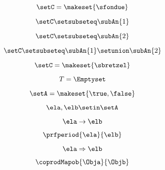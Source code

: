 \begin{forslides}
    \begin{equation}
        \label{eq:feedback-074}
        \setC = \makeset{ \sfondue }
    \end{equation}

    \begin{equation}
        \label{eq:feedback-075}
        \setC \setsubseteq \subAn{1}
    \end{equation}

    \begin{equation}
        \label{eq:feedback-076}
        \setC \setsubseteq \subAn{2}
    \end{equation}

    \begin{equation}
        \label{eq:feedback-077}
        \setC \setsubseteq \subAn{1} \setunion \subAn{2}
    \end{equation}

    \begin{equation}
        \label{eq:feedback-078}
        \setC = \makeset{ \sbretzel }
    \end{equation}

    \begin{equation}
        \label{eq:feedback-079}
        T = \Emptyset
    \end{equation}

    \begin{equation}
        \label{eq:feedback-080}
        \setA = \makeset{ \true, \false }
    \end{equation}

    \begin{equation}
        \label{eq:feedback-081}
        \ela, \elb \setin \setA
    \end{equation}

    \begin{equation}
        \label{eq:feedback-082}
        \ela \to \elb
    \end{equation}

    \begin{equation}
        \label{eq:feedback-083}
        \prfperiod{\ela}{\elb}
    \end{equation}

    \begin{equation}
        \label{eq:feedback-084}
        \ela \Rightarrow \elb
    \end{equation}

    \begin{equation}
        \label{eq:feedback-085}
        \coprodMapob{\Obja}{\Objb}
    \end{equation}


\end{forslides}
